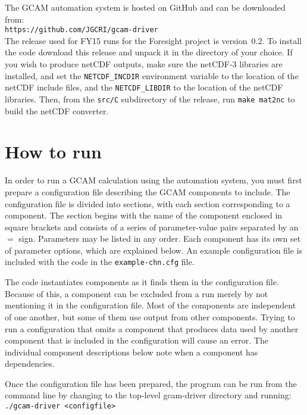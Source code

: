 \documentclass[11pt]{article}
\begin{document}
The GCAM automation system is hosted on GitHub and can be downloaded
from:\\
\texttt{https://github.com/JGCRI/gcam-driver}\\
The release used for FY15 runs for the Foresight project is
version~0.2.  To install the code download this release and unpack it
in the directory of your choice.  If you wish to produce netCDF
outputs, make sure the netCDF-3 libraries are installed, and set the
\texttt{NETCDF\_INCDIR} environment variable to the location of the
netCDF include files, and the \texttt{NETCDF\_LIBDIR} to the location
of the netCDF libraries.  Then, from the \texttt{src/C} subdirectory
of the release, run \texttt{make mat2nc} to build the netCDF
converter.

\section{How to run}

In order to run a GCAM calculation using the automation system, you
must first prepare a configuration file describing the GCAM components to
include.  The configuration file is divided into sections, with each
section corresponding to a component.  The section begins with the name
of the component enclosed in square brackets and consists of a series of
parameter-value pairs separated by an $=$ sign.  Parameters may be
listed in any order.  Each component has its own set of parameter
options, which are explained below.  An example configuration file is
included with the code in the \texttt{example-chn.cfg} file.

The code instantiates components as it finds them in the configuration
file.  Because of this, a component can be excluded from a run merely by
not mentioning it in the configuration file.  Most of the components are
independent of one another, but some of them use output from other
components.  Trying to run a configuration that omits a component that
produces data used by another component that is included in the
configuration will cause an error.  The individual component descriptions
below note when a component has dependencies.

Once the configuration file has been prepared, the program can be run
from the command line by changing to the
top-level gcam-driver directory and running:\\
\texttt{./gcam-driver <configfile>}\\
\end{document}
